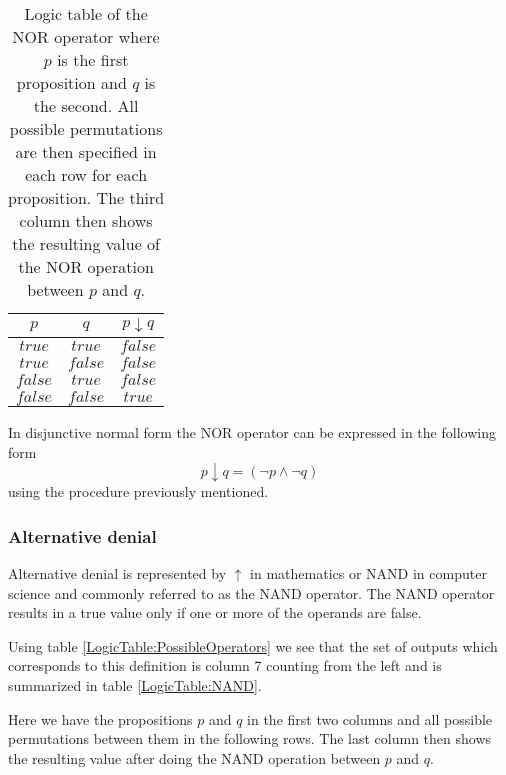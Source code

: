                 \begin{table}[h!]
                    \centering
                    \begin{tabular}{|c|c|c|}
                    	\hline
                    	  $p$   &   $q$   & $p \downarrow q$ \\ \hline
                    	$true$  & $true$  &     $false$      \\ \hline
                    	$true$  & $false$ &     $false$      \\ \hline
                    	$false$ & $true$  &     $false$      \\ \hline
                    	$false$ & $false$ &      $true$      \\ \hline
                    \end{tabular}
                    \caption{Logic table of the NOR operator where $p$ is the first proposition and $q$ is the second. All possible permutations are then specified in each row for each proposition. The third column then shows the resulting value of the NOR operation between $p$ and $q$.}
                    \label{LogicTable:NOR}
                \end{table}
            
                In disjunctive normal form the NOR operator can be expressed in the following form
                \begin{equation}
                p \downarrow q = (\neg p \wedge \neg q)
                \end{equation}
                using the procedure previously mentioned.
                
            \subsubsection{Alternative denial}
                Alternative denial is represented by $\uparrow$ in mathematics or NAND in computer science and commonly referred to as the NAND operator. The NAND operator results in a true value only if one or more of the operands are false.
                
                Using table \ref{LogicTable:PossibleOperators} we see that the set of outputs which corresponds to this definition is column 7 counting from the left and is summarized in table \ref{LogicTable:NAND}.
                
                Here we have the propositions $p$ and $q$ in the first two columns and all possible permutations between them in the following rows. The last column then shows the resulting value after doing the NAND operation between $p$ and $q$.
                
